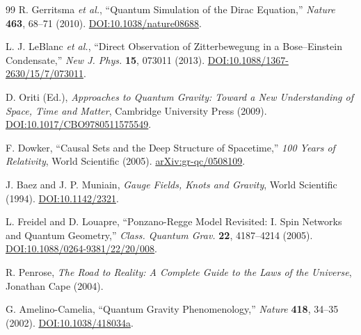 \documentclass[%
 reprint,
 amsmath,amssymb,
 aps,
]{revtex4-1}
\numberwithin{equation}{section}%
\begin{document}
\begin{thebibliography}{99}
R. Gerritsma \textit{et al.},
``Quantum Simulation of the Dirac Equation,''
\textit{Nature} \textbf{463}, 68--71 (2010).
\href{https://doi.org/10.1038/nature08688}{DOI:10.1038/nature08688}.

L. J. LeBlanc \textit{et al.},
``Direct Observation of Zitterbewegung in a Bose--Einstein Condensate,''
\textit{New J. Phys.} \textbf{15}, 073011 (2013).
\href{https://doi.org/10.1088/1367-2630/15/7/073011}{DOI:10.1088/1367-2630/15/7/073011}.

D. Oriti (Ed.),
\textit{Approaches to Quantum Gravity: Toward a New Understanding of Space, Time and Matter},
Cambridge University Press (2009).
\href{https://doi.org/10.1017/CBO9780511575549}{DOI:10.1017/CBO9780511575549}.

F. Dowker,
``Causal Sets and the Deep Structure of Spacetime,''
\textit{100 Years of Relativity}, World Scientific (2005).
\href{https://arxiv.org/abs/gr-qc/0508109}{arXiv:gr-qc/0508109}.

J. Baez and J. P. Muniain,
\textit{Gauge Fields, Knots and Gravity},
World Scientific (1994).
\href{https://doi.org/10.1142/2321}{DOI:10.1142/2321}.

L. Freidel and D. Louapre,
``Ponzano-Regge Model Revisited: I. Spin Networks and Quantum Geometry,''
\textit{Class. Quantum Grav.} \textbf{22}, 4187--4214 (2005).
\href{https://doi.org/10.1088/0264-9381/22/20/008}{DOI:10.1088/0264-9381/22/20/008}.

R. Penrose,
\textit{The Road to Reality: A Complete Guide to the Laws of the Universe},
Jonathan Cape (2004).

G. Amelino-Camelia,
``Quantum Gravity Phenomenology,''
\textit{Nature} \textbf{418}, 34--35 (2002).
\href{https://doi.org/10.1038/418034a}{DOI:10.1038/418034a}.

\end{thebibliography}

\end{document}

